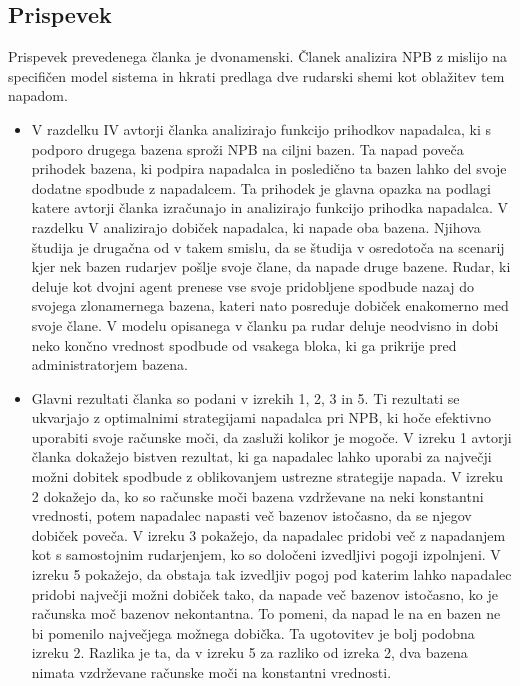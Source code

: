 \documentclass[12pt]{article}
\begin{document}
\subsection{Prispevek}

Prispevek prevedenega članka \cite{originalarticle} je dvonamenski. Članek analizira NPB z mislijo na specifičen model sistema in hkrati predlaga dve rudarski shemi kot oblažitev tem napadom.
\begin{itemize}
	\item V razdelku IV avtorji članka \cite{originalarticle}  analizirajo funkcijo prihodkov napadalca, ki s podporo drugega bazena sproži NPB na ciljni bazen. Ta napad poveča prihodek bazena, ki podpira napadalca in posledično ta bazen lahko del svoje dodatne spodbude z napadalcem. Ta prihodek je glavna opazka na podlagi katere avtorji članka \cite{originalarticle}  izračunajo in analizirajo funkcijo prihodka napadalca. V razdelku V analizirajo dobiček napadalca, ki napade oba bazena.
	Njihova študija je drugačna od \cite{minnersdilemma} v takem smislu, da se študija v  \cite{minnersdilemma} osredotoča na scenarij kjer nek bazen rudarjev pošlje svoje člane, da napade druge bazene. Rudar, ki deluje kot dvojni agent prenese vse svoje pridobljene spodbude nazaj do svojega zlonamernega bazena, kateri nato posreduje dobiček enakomerno med svoje člane. V modelu opisanega v članku \cite{originalarticle} pa rudar deluje neodvisno in dobi neko končno vrednost spodbude od vsakega bloka, ki ga prikrije pred administratorjem bazena.
	\item Glavni rezultati članka so podani v izrekih 1, 2, 3 in 5. Ti rezultati se ukvarjajo z optimalnimi strategijami napadalca pri NPB, ki hoče efektivno uporabiti svoje računske moči, da zasluži kolikor je mogoče. V izreku 1 avtorji članka \cite{originalarticle} dokažejo bistven rezultat, ki ga napadalec lahko uporabi za največji možni dobitek spodbude z oblikovanjem ustrezne strategije napada. 
	V izreku 2 dokažejo da, ko so računske moči bazena vzdrževane na neki konstantni vrednosti, potem napadalec napasti več bazenov istočasno, da se njegov dobiček poveča.
	V izreku 3 pokažejo, da napadalec pridobi več z napadanjem kot s samostojnim rudarjenjem, ko so določeni izvedljivi pogoji izpolnjeni. V izreku 5 pokažejo, da obstaja tak izvedljiv pogoj pod katerim lahko napadalec pridobi največji možni dobiček tako, da napade več bazenov istočasno, ko je računska moč bazenov nekontantna. To pomeni, da napad le na en bazen ne bi pomenilo največjega možnega dobička. Ta ugotovitev je bolj podobna izreku 2. Razlika je ta, da v izreku 5 za razliko od izreka 2, dva bazena nimata vzdrževane računske moči na konstantni vrednosti.

\end{itemize}
\end{document}
